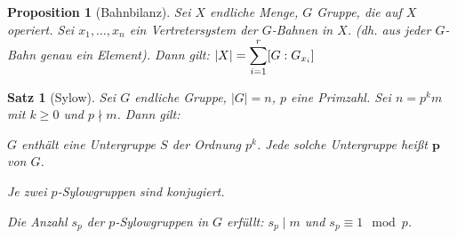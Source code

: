 \documentclass[a4paper,10pt,german]{scrbook}
\theoremstyle{saetze}
\newtheorem{Satz}{Satz}
\theoremstyle{definitionen}
\newtheorem{Prop}[Def]{Proposition}
\begin{document}
\begin{Prop}[Bahnbilanz]
\label{1.23}
    Sei $X$ endliche Menge, $G$ Gruppe, die auf $X$ operiert. Sei
    $x_1,\dots,x_n$ ein Vertretersystem der $G$-Bahnen in $X$. (dh. aus jeder
    $G$-Bahn genau ein Element). Dann gilt: \newline
    $\displaystyle |X| = \sum_{i=1}^r [G:G_{x_i}]$ \newline
\end{Prop}

\begin{Satz}[Sylow]
    Sei $G$ endliche Gruppe, $|G| = n$, $p$ eine Primzahl. Sei $n = p^k m$ mit
    $k \geq 0$ und $p\nmid m$. Dann gilt:
    
    \begin{enum}
        \item $G$ enthält eine Untergruppe $S$ der Ordnung $p^k$. Jede solche 
        Untergruppe heißt $\mathbf{p}$ von $G$.
        
        \item Je zwei $p$-Sylowgruppen sind konjugiert.

        \item Die Anzahl $s_p$ der $p$-Sylowgruppen in $G$ erfüllt: $s_p \mid m$ und
        $s_p \equiv 1 \mod p$.
    \end{enum}

\end{Satz}
\end{document}

